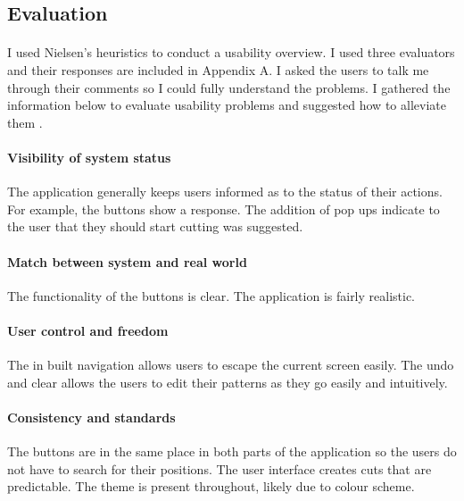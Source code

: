 \documentclass[11pt]{article}
\begin{document}
            \subsection{Evaluation}
            
                \paragraph{}
                I used Nielsen's heuristics to conduct a usability overview. I used three evaluators and their responses are included in Appendix A. I asked the users to talk me through their comments so I could fully understand the problems. I gathered the information below to evaluate usability problems and suggested how to alleviate them \cite{Neil}.

                
                \paragraph{Visibility of system status}
                The application generally keeps users informed as to the status of their actions. For example, the buttons show a response. The addition of pop ups indicate to the user that they should start cutting was suggested. 
                
                \paragraph{Match between system and real world}
                The functionality of the buttons is clear. The application is fairly realistic.
                
                \paragraph{User control and freedom}
                The in built navigation allows users to escape the current screen easily. The undo and clear allows the users to edit their patterns as they go easily and intuitively. 

                \paragraph{Consistency and standards}
                The buttons are in the same place in both parts of the application so the users do not have to search for their positions. The user interface creates cuts that are predictable. The theme is present throughout, likely due to colour scheme.
\end{document}
